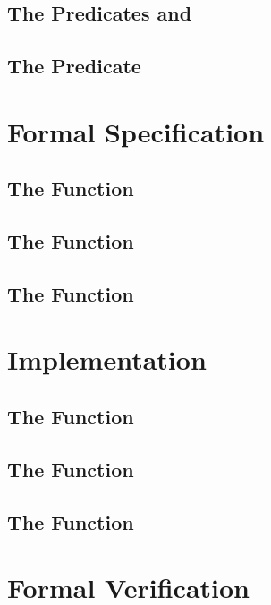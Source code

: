 \subsection{The Predicates \equalbits and \unchanged}
\subsection{The Predicate \upperbitsnotset}

\section{Formal Specification}
\subsection{The Function \bitstreamread}
\subsection{The Function }
\subsection{The Function }

\section{Implementation}
\subsection{The Function \bitstreamread}
\subsection{The Function }
\subsection{The Function }

\section{Formal Verification}
\subsection{}
\subsection{}

